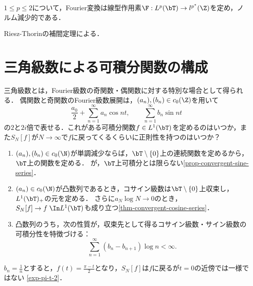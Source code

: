 \documentclass[uplatex,dvipdfmx]{jsreport}
\begin{document}
\begin{theorem}
    $1\le p\le2$について，Fourier変換は線型作用素$\F:L^p(\bT)\to l^{p^*}(\Z)$を定め，ノルム減少的である．
\end{theorem}
\begin{Proof}
    Riesz-Thorinの補間定理による．
\end{Proof}

\section{三角級数による可積分関数の構成}

\begin{tcolorbox}[colframe=ForestGreen, colback=ForestGreen!10!white,breakable,colbacktitle=ForestGreen!40!white,coltitle=black,fonttitle=\bfseries\sffamily,
title=]
    三角級数とは，Fourier級数の奇関数・偶関数に対する特別な場合として得られる．
    偶関数と奇関数のFourier級数展開は，$(a_n),(b_n)\in c_0(\Z)$を用いて
    \[\frac{a_0}{2}+\sum_{n=1}^\infty a_n\cos nt,\qquad \sum_{n=1}^\infty b_n\sin nt\]
    の$2$と$2i$倍で表せる．これがある可積分関数$f\in L^1(\bT)$を定めるのはいつか，また$S_N[f]$が$N\to\infty$で$f$に戻ってくるくらいに正則性を持つのはいつか？
\end{tcolorbox}

\begin{remarks}\mbox{}
    \begin{enumerate}
        \item $(a_n),(b_n)\in c_0(\N)$が単調減少ならば，$\bT\setminus\{0\}$上の連続関数を定めるから，$\bT$上の関数を定める．
        が，$\bT$上可積分とは限らない\ref{prop-convergent-sine-series}．
        \item $(a_n)\in c_0(\N)$が凸数列であるとき，コサイン級数は$\bT\setminus\{0\}$上収束し，$L^1(\bT)_+$の元を定める．
        さらに$a_N\log N\to0$のとき，$S_N[f]\to f\;\In L^1(\bT)$も成り立つ\ref{thm-convergent-cosine-series}．
        \item 凸数列のうち，次の性質が，収束先として得るコサイン級数・サイン級数の可積分性を特徴づける：
        \[\sum_{n=1}^\infty(b_n-b_{n+1})\log n<\infty.\]
    \end{enumerate}
\end{remarks}

\begin{example}
    $b_n=\frac{1}{n}$とすると，$f(t)=\frac{\pi-t}{2}$となり，$S_N[f]$は$f$に戻るが$t=0$の近傍では一様ではない
    \ref{exp-pi-t-2}．
\end{example}
\end{document}
